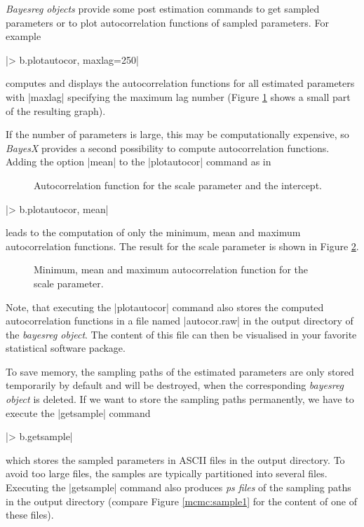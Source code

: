 {\it Bayesreg objects} provide some post estimation commands to get sampled parameters or to plot autocorrelation functions of
sampled parameters. For example

|> b.plotautocor, maxlag=250|

computes and displays the autocorrelation functions for all estimated parameters with |maxlag| specifying the maximum lag
number (Figure \ref{mcmc:autocor1} shows a small part of the resulting graph).

If the number of parameters is large, this may be computationally expensive, so {\it BayesX} provides a second possibility to
compute autocorrelation functions. Adding the option |mean| to the |plotautocor| command as in

\begin{figure}[ht]
\begin{center}
{\it\caption{Autocorrelation function for the scale parameter and
the intercept.\label{mcmc:autocor1}}}
\end{center}
\end{figure}

|> b.plotautocor, mean|

leads to the computation of only the minimum, mean and maximum autocorrelation functions. The result for the scale parameter is
shown in Figure \ref{mcmc:autocor2}.

\begin{figure}[ht]
\begin{center}
{\it\caption{Minimum, mean and maximum autocorrelation function
for the scale parameter.\label{mcmc:autocor2}}}
\end{center}
\end{figure}

Note, that executing the |plotautocor| command also stores the computed autocorrelation functions in a file named |autocor.raw|
in the output directory of the {\it bayesreg object}. The content of this file can then be visualised in your favorite
statistical software package.

To save memory, the sampling paths of the estimated parameters are only stored temporarily by default and will be destroyed,
when the corresponding {\it bayesreg object} is deleted. If we want to store the sampling paths permanently, we have to execute
the |getsample| command

|> b.getsample|

which stores the sampled parameters in ASCII files in the output directory. To avoid too large files, the samples are typically
partitioned into several files. Executing the |getsample| command also produces {\it ps files} of the sampling paths in the
output directory (compare Figure \ref{mcmc:sample1} for the content of one of these files).

